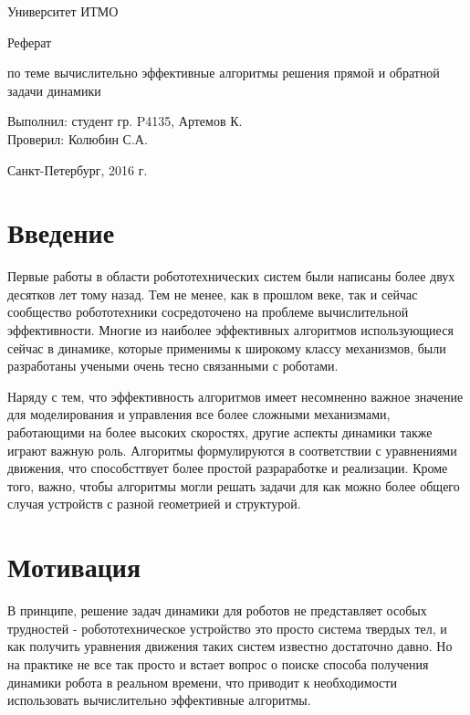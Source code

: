 \documentclass[a4paper,14pt]{extreport}
\begin{document}
\large Университет ИТМО

\vspace{7cm}

\large Реферат

\large по теме вычислительно эффективные алгоритмы решения прямой и обратной задачи динамики\\

\vspace{4cm}

\large Выполнил: студент гр. P4135, Артемов К.\\
\large Проверил: Колюбин С.А.\\

\vspace{7cm}

Санкт-Петербург, 2016 г.

\newpage
\tableofcontents
\newpage

\section{Введение}


Первые работы в области робототехнических систем были написаны более двух десятков лет тому назад. Тем не менее, как в прошлом веке, так и сейчас сообщество робототехники сосредоточено на проблеме вычислительной эффективности. Многие из наиболее эффективных алгоритмов использующиеся сейчас в динамике, которые применимы к широкому классу механизмов, были разработаны учеными очень тесно связанными с роботами. 

Наряду с тем, что эффективность алгоритмов имеет несомненно важное значение для моделирования и управления все более сложными механизмами, работающими на более высоких скоростях, другие аспекты динамики также играют важную роль. 
Алгоритмы формулируются в соответствии с уравнениями движения, что способсттвует более простой разраработке и реализации. Кроме того, важно, чтобы алгоритмы могли решать задачи для как можно более общего случая устройств с разной геометрией и структурой.


\newpage
\section{Мотивация}


В принципе, решение задач динамики для роботов не представляет особых трудностей - робототехническое устройство это просто система твердых тел, и как получить уравнения движения таких систем известно достаточно давно. Но на практике не все так просто и встает вопрос о поиске способа получения динамики робота в реальном времени, что приводит к необходимости использовать вычислительно эффективные алгоритмы.
\end{document}

